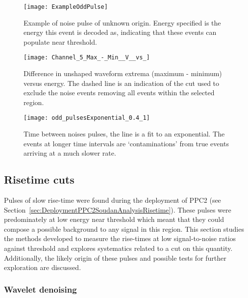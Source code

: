 			\begin{figure}
				\centering
				\texttt{[image: ExampleOddPulse]}
				\caption[Example of noise pulse of unknown origin]
				{Example of noise pulse of unknown origin.  Energy specified is the energy this event is decoded as, indicating that these events can populate
				 near threshold.}
				\label{fig:OddPulseExample}
			\end{figure}	

			\begin{figure}
				\centering
				\texttt{[image: Channel\_5\_Max\_-\_Min\_\_V\_\_vs\_]}
				\caption[Difference in unshaped waveform extrema versus energy]
				{Difference in unshaped waveform extrema (maximum - minimum) versus energy.  The dashed line is an indication of the cut used to exclude the 
				noise events removing all events within the selected region. }
				\label{fig:OddPulseCut}
			\end{figure}

			\begin{figure}
				\centering
				\texttt{[image: odd\_pulsesExponential\_0.4\_1]}
				\caption[Time between noises pulses]
				{Time between noises pulses, the line is a fit to an exponential.  The events at longer time intervals are `contaminations' from true events arriving at a
				much slower rate.}
				\label{fig:OddPulseRate}
			\end{figure}
				
		\subsection{Risetime cuts}
	     	\label{sec:RisetimeCuts}	

	Pulses of slow rise-time were found during the deployment of PPC2 (see Section~\ref{sec:DeploymentPPC2SoudanAnalysisRisetime}).  These pulses were predominately at low energy near threshold which meant that they could compose a possible background to any signal in this region.  This section studies the methods developed to measure the rise-times at low signal-to-noise ratios against threshold and explores systematics related to a cut on this quantity.  Additionally, the likely origin of these pulses and possible tests for further exploration are discussed. 
	
			\subsubsection{Wavelet denoising}
		     	\label{sec:RisetimeCutsWaveletDenoise}
					
